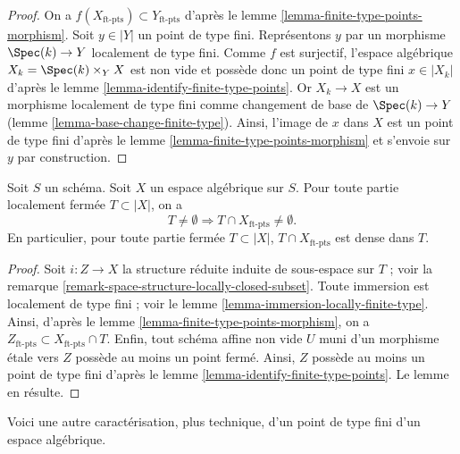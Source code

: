 \begin{proof}
On a $f(X_{\text{ft-pts}}) \subset Y_{\text{ft-pts}}$ d'après le
lemme \ref{lemma-finite-type-points-morphism}.
Soit $y \in |Y|$ un point de type fini. Représentons $y$ par un morphisme
$\Spec(k) \to Y$ localement de type fini.
Comme $f$ est surjectif, l'espace algébrique
$X_k = \Spec(k) \times_Y X$ est non vide et possède donc
un point de type fini $x \in |X_k|$ d'après le
lemme \ref{lemma-identify-finite-type-points}.
Or $X_k \to X$ est un morphisme localement de type fini comme changement de base
de $\Spec(k) \to Y$
(lemme \ref{lemma-base-change-finite-type}).
Ainsi, l'image de $x$ dans $X$ est un point de type fini d'après le
lemme \ref{lemma-finite-type-points-morphism}
et s'envoie sur $y$ par construction.
\end{proof}

\begin{lemma}
\label{lemma-enough-finite-type-points}
Soit $S$ un schéma. Soit $X$ un espace algébrique sur $S$.
Pour toute partie localement fermée $T \subset |X|$, on a
$$
T \not = \emptyset
\Rightarrow
T \cap X_{\text{ft-pts}} \not = \emptyset.
$$
En particulier, pour toute partie fermée $T \subset |X|$,
$T \cap X_{\text{ft-pts}}$ est dense dans $T$.
\end{lemma}

\begin{proof}
Soit $i : Z \to X$ la structure réduite induite de sous-espace sur $T$ ; voir la
remarque \ref{remark-space-structure-locally-closed-subset}.
Toute immersion est localement de type fini ; voir le
lemme \ref{lemma-immersion-locally-finite-type}.
Ainsi, d'après le
lemme \ref{lemma-finite-type-points-morphism},
on a $Z_{\text{ft-pts}} \subset X_{\text{ft-pts}} \cap T$.
Enfin, tout schéma affine non vide $U$ muni d'un morphisme étale vers
$Z$ possède au moins un point fermé. Ainsi, $Z$ possède au moins un
point de type fini d'après le
lemme \ref{lemma-identify-finite-type-points}.
Le lemme en résulte.
\end{proof}

\noindent
Voici une autre caractérisation, plus technique, d'un point de type fini
d'un espace algébrique.

